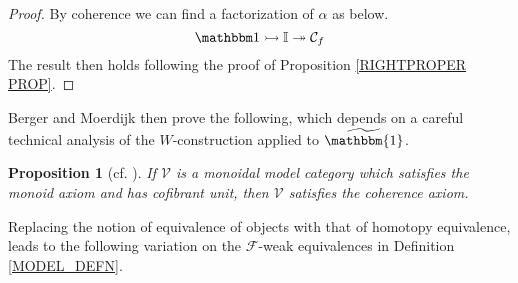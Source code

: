 \documentclass[a4paper,10pt
,draft
]{article}%
\numberwithin{equation}{section}
\numberwithin{figure}{section}
\newtheorem{proposition}[equation]{Proposition}%
\theoremstyle{definition} %
\newcommand{\F}{\ensuremath{\mathcal F}}
\newcommand{\V}{\ensuremath{\mathcal V}}
\newcommand{\1}{\ensuremath{\mathbbm 1}}%
\begin{document}
\begin{proof}
By coherence we can find a factorization of 
$\alpha$ as below. %
\[
      \1 \rightarrowtail \mathbb I \twoheadrightarrow \mathcal C_f
\]
The result then holds following the proof of Proposition \ref{RIGHTPROPER PROP}.
\end{proof}





Berger and Moerdijk then prove the following,
which depends on a careful technical analysis of the $W$-construction applied to 
$\widetilde{\mathbbm{1}}$.




\begin{proposition}[{cf. \cite[Prop. 2.24]{BM13}}]
\label{COHAX PROP}
If $\V$ is a monoidal model category {\color{blue} which satisfies the monoid axiom and has cofibrant unit},
then $\V$ satisfies the coherence axiom.
\end{proposition}



Replacing the notion of equivalence of objects
with that of homotopy equivalence, 
leads to the following variation on the 
$\F$-weak equivalences in Definition \ref{MODEL_DEFN}. 
\end{document}
